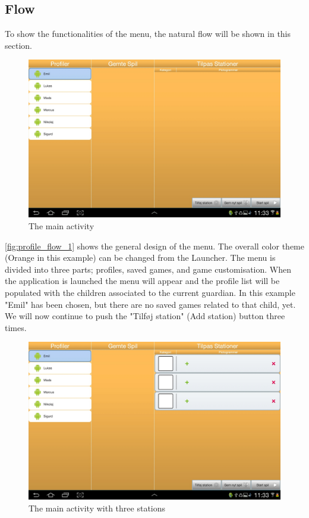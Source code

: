 \subsection{Flow}
To show the functionalities of the menu, the natural flow will be shown in this section.
\begin{figure}[H]
\centering
\includegraphics[width=0.9\linewidth]{img/screenshots/profile_flow_1.jpg}%
\caption{The main activity}
\label{fig:profile_flow_1}
\end{figure}
\autoref{fig:profile_flow_1} shows the general design of the menu. The overall color theme (Orange in this example) can be changed from the Launcher. The menu is divided into three parts; profiles, saved games, and game customisation. When the application is launched the menu will appear and the profile list will be populated with the children associated to the current guardian. In this example "Emil" has been chosen, but there are no saved games related to that child, yet.
We will now continue to push the "Tilføj station" (Add station) button three times.

\begin{figure}[H]
\centering
\includegraphics[width=0.9\linewidth]{img/screenshots/profile_flow_2.jpg}%
\caption{The main activity with three stations}
\label{fig:profile_flow_2}
\end{figure}

